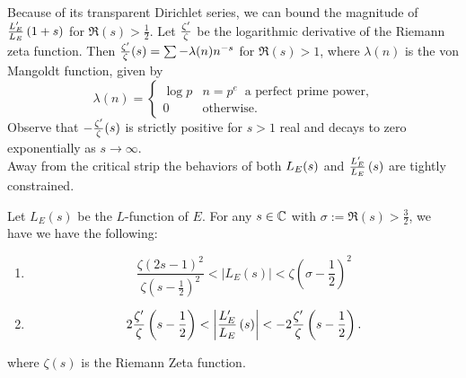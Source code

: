 Because of its transparent Dirichlet series, we can bound the magnitude of $\frac{L_E^{\prime}}{L_E}\left(1+s\right)$ for $\Re(s)>\frac{1}{2}$. Let $\frac{\zeta^{\prime}}{\zeta}$ be the logarithmic derivative of the Riemann zeta function. Then $\frac{\zeta^{\prime}}{\zeta}(s) = \sum -\lambda(n) n^{-s}$ for $\Re(s)>1$, where $\lambda(n)$ is the von Mangoldt function, given by
\begin{equation}\label{eqn:vonmangoldt}
\lambda(n) = \begin{cases} \log p & n = p^e \;\;\text{a perfect prime power,} \\ 0 & \text{otherwise.} \end{cases}
\end{equation}
Observe that $-\frac{\zeta^{\prime}}{\zeta}(s)$ is strictly positive for $s > 1$ real and decays to zero exponentially as $s \to \infty$. \\

Away from the critical strip the behaviors of both $L_E(s)$ and $\frac{L_E^{\prime}}{L_E}\left(s\right)$ are tightly constrained.
\begin{lemma}\label{lem:ldLe_bound}
Let $L_E(s)$ be the $L$-function of $E$. For any $s \in \mathbb{C}$ with $\sigma := \Re(s) >\frac{3}{2}$, we have we have the following:
\begin{enumerate}
\item
\begin{equation}\label{ineq:bounds_on_Les}
\frac{\zeta(2s-1)^2}{\zeta(s-\frac{1}{2})^2} < \left|L_E(s)\right| < \zeta\left(\sigma-\frac{1}{2}\right)^2
\end{equation}
\item
\begin{equation}\label{ineq:bounds_on_Ldles}
2\frac{\zeta^{\prime}}{\zeta}\left(s-\frac{1}{2}\right) < \left| \frac{L_E^{\prime}}{L_E}\left(s\right)\right| < -2\frac{\zeta^{\prime}}{\zeta}\left(s-\frac{1}{2}\right).
\end{equation}
\end{enumerate}
where $\zeta(s)$ is the Riemann Zeta function.
\end{lemma}

